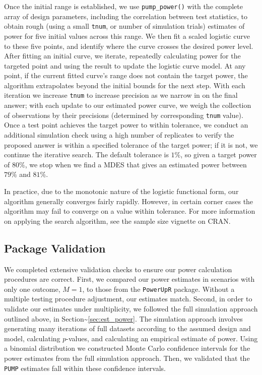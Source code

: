 \documentclass[
]{article}
\begin{document}
Once the initial range is established, we use \texttt{pump\_power()}
with the complete array of design parameters, including the correlation
between test statistics, to obtain rough (using a small \texttt{tnum},
or number of simulation trials) estimates of power for five initial
values across this range. We then fit a scaled logistic curve to these
five points, and identify where the curve crosses the desired power
level. After fitting an initial curve, we iterate, repeatedly
calculating power for the targeted point and using the result to update
the logistic curve model. At any point, if the current fitted curve's
range does not contain the target power, the algorithm extrapolates
beyond the initial bounds for the next step. With each iteration we
increase \texttt{tnum} to increase precision as we narrow in on the
final answer; with each update to our estimated power curve, we weigh
the collection of observations by their precisions (determined by
corresponding \texttt{tnum} value). Once a test point achieves the
target power to within tolerance, we conduct an additional simulation
check using a high number of replicates to verify the proposed answer is
within a specified tolerance of the target power; if it is not, we
continue the iterative search. The default tolerance is \(1\%\), so
given a target power of \(80\%\), we stop when we find a MDES that gives
an estimated power between \(79\%\) and \(81\%\).

In practice, due to the monotonic nature of the logistic functional
form, our algorithm generally converges fairly rapidly. However, in
certain corner cases the algorithm may fail to converge on a value
within tolerance. For more information on applying the search algorithm,
see the sample size vignette on CRAN.

\subsection{Package Validation}

We completed extensive validation checks to ensure our power calculation
procedures are correct. First, we compared our power estimates in
scenarios with only one outcome, \(M = 1\), to those from the
\texttt{PowerUpR} package. Without a multiple testing procedure
adjustment, our estimates match. Second, in order to validate our
estimates under multiplicity, we followed the full simulation approach
outlined above, in Section\textasciitilde{}\ref{sec:est_power}. The
simulation approach involves generating many iterations of full datasets
according to the assumed design and model, calculating \(p\)-values, and
calculating an empirical estimate of power. Using a binomial
distribution we constructed Monte Carlo confidence intervals for the
power estimates from the full simulation approach. Then, we validated
that the \texttt{PUMP} estimates fall within these confidence intervals.
\end{document}
